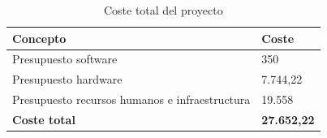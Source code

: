 \begin{table}[!htb]
    \begin{tabular}{|>{\arraybackslash}m{8.15cm} | >{\arraybackslash}m{5cm} |}
        \hline
        \vspace{0.5em} \textbf{ Concepto } \vspace{0.5em} & \vspace{0.5em} \textbf{Coste} \vspace{0.5em} \\
        \hline 
        \vspace{0.5em} Presupuesto software \vspace{0.5em} & \vspace{0.5em} 350\EUR{} \vspace{0.5em} \\
        \hline
        \vspace{0.5em} Presupuesto hardware \vspace{0.5em} & \vspace{0.5em} 7.744,22\EUR{} \vspace{0.5em} \\
        \hline
        \vspace{0.5em} Presupuesto recursos humanos e infraestructura \vspace{0.5em} & \vspace{0.5em} 19.558\EUR{} \vspace{0.5em} \\
        \hline
        \vspace{0.5em} \textbf{Coste total} \vspace{0.5em} & \vspace{0.5em} \textbf{27.652,22\EUR{}} \vspace{0.5em}
         \\
        \hline
    \end{tabular}
    \caption{Coste total del proyecto}
    \label{tabla:presupuesto}
\end{table}
